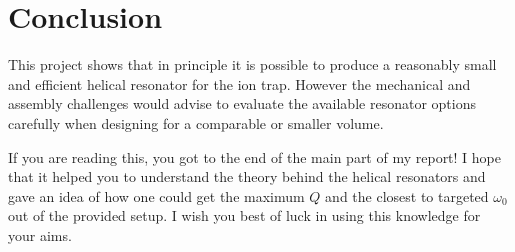\chapter{Conclusion}

This project shows that in principle it is possible to produce a reasonably small and efficient helical resonator for the ion trap. However the mechanical and assembly challenges would advise to evaluate the available resonator options carefully when designing for a comparable or smaller volume.

If you are reading this, you got to the end of the main part of my report! I hope that it helped you to understand the theory behind the helical resonators and gave an idea of how one could get the maximum $Q$ and the closest to targeted $\omega_0$ out of the provided setup. I wish you best of luck in using this knowledge for your aims.